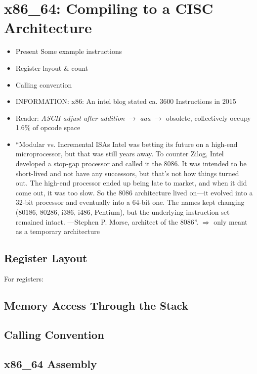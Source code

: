 \section{x86\_64: Compiling to a CISC Architecture}

\begin{itemize}
	\item Present Some example instructions
	\item Register layout \& count
	\item Calling convention
	\item INFORMATION: x86: An intel blog stated ca. 3600 Instructions in 2015 \cite{Rodgers2017}
	\item \riscv{} Reader: \emph{ASCII adjust after addition} $\rightarrow$ \emph{aaa} $\rightarrow$ obsolete, collectively occupy 1.6\% of opcode space\cite[p.~4]{Patterson2017}
	\item
	      \enquote{Modular vs. Incremental ISAs Intel was betting its future on a high-end microprocessor, but that was still years away.
		      To counter Zilog, Intel developed a stop-gap processor and called it the 8086. It was intended to be short-lived and not have any successors,
		      but that’s not how things turned out. The high-end processor ended up being late to market, and when it did come out, it was too slow.
		      So the 8086 architecture lived on—it evolved into a 32-bit processor and eventually into a 64-bit one.
		      The names kept changing (80186, 80286, i386, i486, Pentium), but the underlying instruction set remained intact. —Stephen P. Morse, architect of the 8086}\cite{Morse2017}.
	      $\Rightarrow$ only meant as a temporary architecture
\end{itemize}

\subsection{Register Layout}

For registers: \cite[p.~7]{Kusswurm2018-nd}

\subsection{Memory Access Through the Stack}

\subsection{Calling Convention}

\subsection{x86\_64 Assembly}

